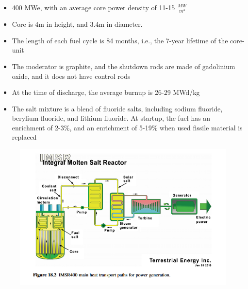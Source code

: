 \documentclass[letterpaper]{article}
\begin{document}
\begin{itemize}
\item 400 MWe, with an average core power density of 11-15 $\frac{MW}{m^{3}}$
\item Core is 4m in height, and 3.4m in diameter.
\item The length of each fuel cycle is 84 months, i.e., the 7-year lifetime of the core-unit
\item The moderator is graphite, and the shutdown rods are made of gadolinium oxide, and it does not have control rods
\item At the time of discharge, the average burnup is 26-29 MWd/kg
\item The salt mixture is a blend of fluoride salts, including sodium fluoride, berylium fluoride, and lithium fluoride.  At startup, the fuel has an enrichment of 2-3\%, and an enrichment of 5-19\% when used fissile material is replaced
\end{itemize}

\begin{figure}[H]
  \centering
  \includegraphics[width=1.0\linewidth]{figures/IMSRsource1.png}
  \label{fig:fig8}
\end{figure}
\end{document}
